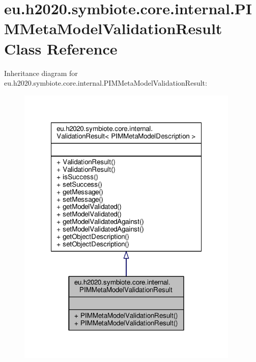 \hypertarget{classeu_1_1h2020_1_1symbiote_1_1core_1_1internal_1_1PIMMetaModelValidationResult}{}\section{eu.\+h2020.\+symbiote.\+core.\+internal.\+P\+I\+M\+Meta\+Model\+Validation\+Result Class Reference}
\label{classeu_1_1h2020_1_1symbiote_1_1core_1_1internal_1_1PIMMetaModelValidationResult}


Inheritance diagram for eu.\+h2020.\+symbiote.\+core.\+internal.\+P\+I\+M\+Meta\+Model\+Validation\+Result\+:\nopagebreak
\begin{figure}[H]
\begin{center}
\leavevmode
\includegraphics[width=300pt]{classeu_1_1h2020_1_1symbiote_1_1core_1_1internal_1_1PIMMetaModelValidationResult__inherit__graph}
\end{center}
\end{figure}


